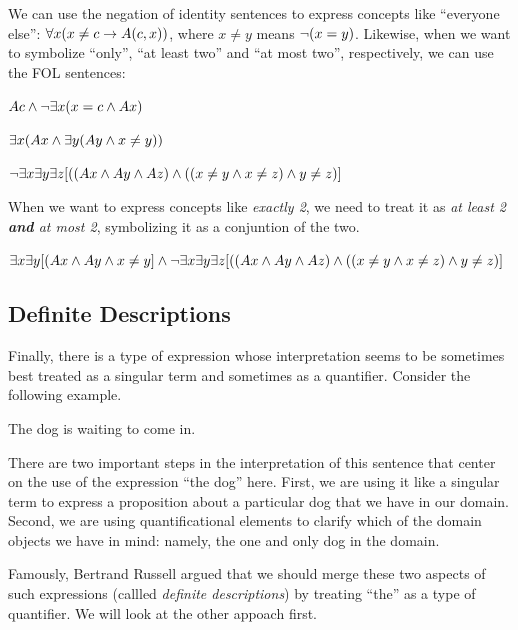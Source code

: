 We can use the negation of identity sentences to express concepts like
``everyone else'': $\forall x(x\neq c\rightarrow A(c,x))$, where $x\neq y$ means
$\neg(x=y)$. Likewise, when we want to symbolize ``only'', ``at least two''
and ``at most two'', respectively, we can use the FOL sentences:

\begin{argument}
\item[ ] $Ac\wedge\neg\exists x(x=c\wedge Ax)$
\item[ ] $\exists x(Ax\wedge \exists y(Ay\wedge x\neq y))$
\item[ ] $\neg\exists x\exists y\exists z[((Ax\wedge Ay\wedge Az)\wedge((x\neq y\wedge x\neq z)\wedge y\neq z)]$
\end{argument}

When we want to express concepts like \emph{exactly 2}, we need to treat it
as \emph{at least 2 \textbf{and} at most 2}, symbolizing it as a conjuntion of
the two.

\begin{argument}
\item[ ] $\exists x\exists y[(Ax\wedge Ay\wedge x\neq y]\wedge\neg\exists x\exists y\exists z[((Ax\wedge Ay\wedge Az)\wedge((x\neq y\wedge x\neq z)\wedge y\neq z)]$
\end{argument}

\subsection{Definite Descriptions}

Finally, there is a type of expression whose interpretation seems to be
sometimes best treated as a singular term and sometimes as a quantifier.
Consider the following example.

\begin{argument}
\item[ ] The dog is waiting to come in.
\end{argument}

There are two important steps in the interpretation of this sentence that center
on the use of the expression ``the dog'' here. First, we are using it like a
singular term to express a proposition about a particular dog that we have in
our domain. Second, we are using quantificational elements to clarify which of
the domain objects we have in mind: namely, the one and only dog in the domain.

Famously, Bertrand Russell argued that we should merge these two aspects of such
expressions (callled \emph{definite descriptions}) by treating ``the'' as a
type of quantifier. We will look at the other appoach first.

